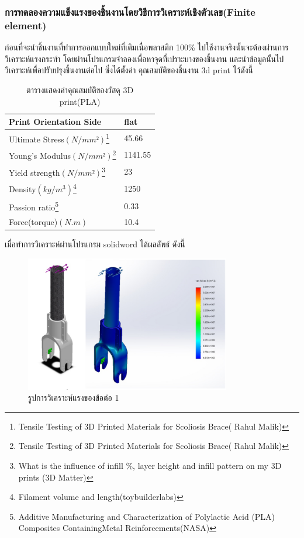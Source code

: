 \subsubsection*{การทดลองความแข็งแรงของชิ้นงานโดยวิธีการวิเคราะห์เชิงตัวเลข(Finite element)}
ก่อนที่จะนำชิ้นงานที่ทำการออกแบบใหม่ที่เติมเนื่อพลาสติก 100\% ไปใช้งานจริงนั้นจะต้องผ่านการวิเคราะห์แรงกระทำ
โดยผ่านโปรแกรมจำลองเพื่อหาจุดที่เปราะบางของชิ้นงาน  และนำข้อมูลนั้นไปวิเคราะห์เพื่อปรับปรุงชิ้นงานต่อไป 
ซึ่งได้ตั้งค่า คุณสมบัติของชิ้นงาน 3d print ไว้ดังนี้ 
\begin{table}[ht]
	\centering
	\begin{tabular}{| l | l |}
		\hline
		Print Orientation Side	& flat \\
        \hline
        Ultimate Stress$(N/mm²)$\footnote{Tensile Testing of 3D Printed Materials for Scoliosis Brace( Rahul Malik)} & 	45.66 \\
        Young’s Modulus$(N/mm²)$\footnote{Tensile Testing of 3D Printed Materials for Scoliosis Brace( Rahul Malik)} & 	1141.55 \\
        Yield strength$(N/mm²)$\footnote{What is the influence of infill \%, layer height and infill pattern on my 3D prints (3D Matter)} & 23 \\
        Density$(kg/m^3)$\footnote{Filament volume and length(toybuilderlabs)} &	1250 \\
        Passion ratio\footnote{Additive Manufacturing and Characterization of Polylactic Acid (PLA) Composites ContainingMetal Reinforcements(NASA)} &	0.33 \\
        Force(torque)$(N.m)$ & 10.4 \\
	    \hline
	\end{tabular}
	\caption{ตารางแสดงค่าคุณสมบัติของวัสดุ 3D print(PLA)}
	\label{tab:PLA_property}
\end{table}

เมื่อทำการวิเคราะห์ผ่านโปรแกรม solidword ได้ผลลัพธ์ ดังนี้

\begin{figure}[h!]
  \centering
  \includegraphics[width=0.8\textwidth]{chapter4/images/FEA1.png}
  \caption{รูปการวิเคราะห์แรงของข้อต่อ 1}
  \label{fig:FEAjoint1}
\end{figure}

